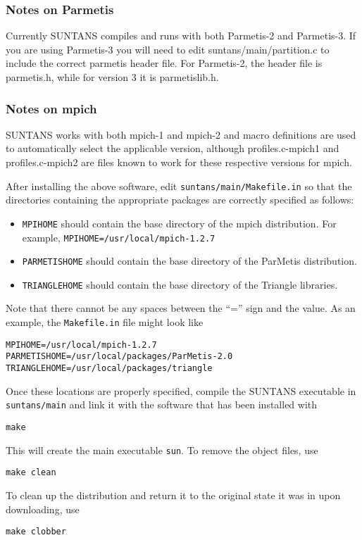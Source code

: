 \subsubsection{Notes on Parmetis}

Currently SUNTANS compiles and runs with both Parmetis-2
and Parmetis-3.  If you are using Parmetis-3 you will need to edit suntans/main/partition.c
to include the correct parmetis header file.  For Parmetis-2, the header file is parmetis.h,
while for version 3 it is parmetislib.h.

\subsubsection{Notes on mpich}

SUNTANS works with both mpich-1 and mpich-2 and macro definitions are used to automatically
select the applicable version, although profiles.c-mpich1 and profiles.c-mpich2 are files known
to work for these respective versions for mpich. 

\medskip

After installing the above software, edit \verb+suntans/main/Makefile.in+ 
so that the directories containing the appropriate packages
are correctly specified as follows:
\begin{itemize}
\item \verb+MPIHOME+ should contain the base directory of the mpich distribution.
For example, 
\verb+MPIHOME=/usr/local/mpich-1.2.7+
\item \verb+PARMETISHOME+ should contain the base directory of the ParMetis distribution.
\item \verb+TRIANGLEHOME+ should contain the base directory of the Triangle libraries.
\end{itemize}
Note that there cannot be any spaces between the ``='' sign and the value.  As an example,
the \verb+Makefile.in+ file might look like
\begin{verbatim}
MPIHOME=/usr/local/mpich-1.2.7
PARMETISHOME=/usr/local/packages/ParMetis-2.0
TRIANGLEHOME=/usr/local/packages/triangle
\end{verbatim}
Once these locations are properly specified, compile the SUNTANS executable in \verb+suntans/main+ and
link it with the software that has been installed with
\begin{verbatim}
make
\end{verbatim}
This will create the main executable \verb+sun+.  
To remove the object files, use
\begin{verbatim}
make clean
\end{verbatim}
To clean up the distribution and return it to the original state it was in upon downloading,
use
\begin{verbatim}
make clobber
\end{verbatim}

